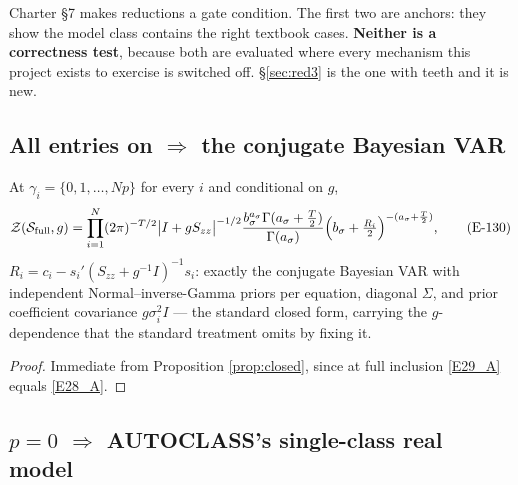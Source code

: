 Charter \S7 makes reductions a gate condition. The first two are anchors: they show
the model class contains the right textbook cases. \textbf{Neither is a correctness
test}, because both are evaluated where every mechanism this project exists to
exercise is switched off. \S\ref{sec:red3} is the one with teeth and it is new.

\subsection{All entries on $\Rightarrow$ the conjugate Bayesian VAR}

\begin{proposition}[reduction 1]\label{prop:red1}
At $\gamma_i=\{0,1,\dots,Np\}$ for every $i$ and conditional on $g$,
\begin{equation}
\mathcal{Z}(\mathcal{S}_{\text{full}},g) = \prod_{i=1}^{N}(2\pi)^{-T/2}\bigl|I+gS_{zz}\bigr|^{-1/2}
\frac{b_\sigma^{a_\sigma}\Gamma(a_\sigma+\frac{T}{2})}{\Gamma(a_\sigma)}
\Bigl(b_\sigma+\tfrac{R_i}{2}\Bigr)^{-(a_\sigma+\frac{T}{2})},
\tag{E-130}\label{E130}
\end{equation}
$R_i=c_i-s_i'(S_{zz}+g^{-1}I)^{-1}s_i$: exactly the conjugate Bayesian VAR with
independent Normal--inverse-Gamma priors per equation, diagonal $\Sigma$, and prior
coefficient covariance $g\sigma_i^2I$ --- the standard closed form, carrying the
$g$-dependence that the standard treatment omits by fixing it.
\end{proposition}

\begin{proof}
Immediate from Proposition \ref{prop:closed}, since at full inclusion \eqref{E29_A}
equals \eqref{E28_A}.
\end{proof}

\subsection{$p=0$ $\Rightarrow$ AUTOCLASS's single-class real model}\label{sec:red2}


